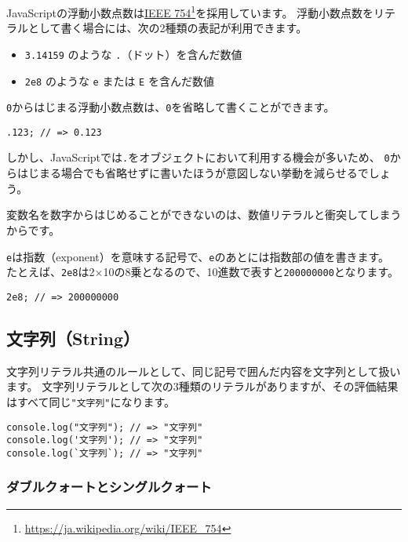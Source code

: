 JavaScriptの浮動小数点数は\href{https://ja.wikipedia.org/wiki/IEEE_754}{IEEE 754}\footnote{\url{https://ja.wikipedia.org/wiki/IEEE_754}}を採用しています。
浮動小数点数をリテラルとして書く場合には、次の2種類の表記が利用できます。

\begin{itemize}
\item
  \texttt{3.14159} のような
  \texttt{.}（ドット）を含んだ数値
\item
  \texttt{2e8} のような \texttt{e}
  または \texttt{E} を含んだ数値
\end{itemize}

\texttt{0}からはじまる浮動小数点数は、\texttt{0}を省略して書くことができます。

\begin{lstlisting}
.123; // => 0.123
\end{lstlisting}

しかし、JavaScriptでは\texttt{.}をオブジェクトにおいて利用する機会が多いため、
\texttt{0}からはじまる場合でも省略せずに書いたほうが意図しない挙動を減らせるでしょう。

\begin{note}{}
変数名を数字からはじめることができないのは、数値リテラルと衝突してしまうからです。
\end{note}

\texttt{e}は指数（exponent）を意味する記号で、\texttt{e}のあとには指数部の値を書きます。
たとえば、\texttt{2e8}は2×10の8乗となるので、10進数で表すと\texttt{200000000}となります。

\begin{lstlisting}
2e8; // => 200000000
\end{lstlisting}

\hypertarget{string-literal}{%
\subsection{文字列（String）}\label{string-literal}}

文字列リテラル共通のルールとして、同じ記号で囲んだ内容を文字列として扱います。
文字列リテラルとして次の3種類のリテラルがありますが、その評価結果はすべて同じ\texttt{"文字列"}になります。

\begin{lstlisting}
console.log("文字列"); // => "文字列"
console.log('文字列'); // => "文字列"
console.log(`文字列`); // => "文字列"
\end{lstlisting}

\hypertarget{double-quote-and-single-quote}{%
\subsubsection{ダブルクォートとシングルクォート}\label{double-quote-and-single-quote}}

